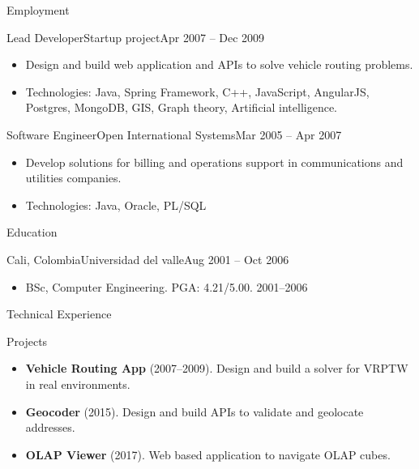 \documentclass[]{mcdowellcv}
\begin{document}
\begin{cvsection}{Employment}
		\begin{cvsubsection}{Lead Developer}{Startup project}{Apr 2007 -- Dec 2009}		
			\begin{itemize}
				\item Design and build web application and APIs to solve vehicle routing problems.
				\item Technologies: Java, Spring Framework, C++, JavaScript, AngularJS, Postgres, MongoDB, GIS, Graph theory, Artificial intelligence. 	
			\end{itemize}
		\end{cvsubsection}
		
		\begin{cvsubsection}{Software Engineer}{Open International Systems}{Mar 2005 -- Apr 2007}	
			\begin{itemize}
				\item Develop solutions for billing and operations support in communications and utilities companies.
				\item Technologies: Java, Oracle, PL/SQL 	
			\end{itemize}
			
		\end{cvsubsection}
	\end{cvsection}
	
	\begin{cvsection}{Education}
		\begin{cvsubsection}{Cali, Colombia}{Universidad del valle}{Aug 2001 -- Oct 2006}
			\begin{itemize}
				\item BSc,	Computer	Engineering. PGA: 4.21/5.00. 2001--2006
			\end{itemize}
		\end{cvsubsection}
	\end{cvsection}
	
	\begin{cvsection}{Technical Experience}
		\begin{cvsubsection}{Projects}{}{}
			\begin{itemize}
				\item \textbf{Vehicle Routing App} (2007--2009). Design and build a solver for VRPTW in real environments.
				\item \textbf{Geocoder} (2015). Design and build APIs to validate and geolocate addresses. 
				\item \textbf{OLAP Viewer} (2017).  Web based application to navigate OLAP cubes.

			\end{itemize}
		\end{cvsubsection}
	\end{cvsection}
	
\end{document}
